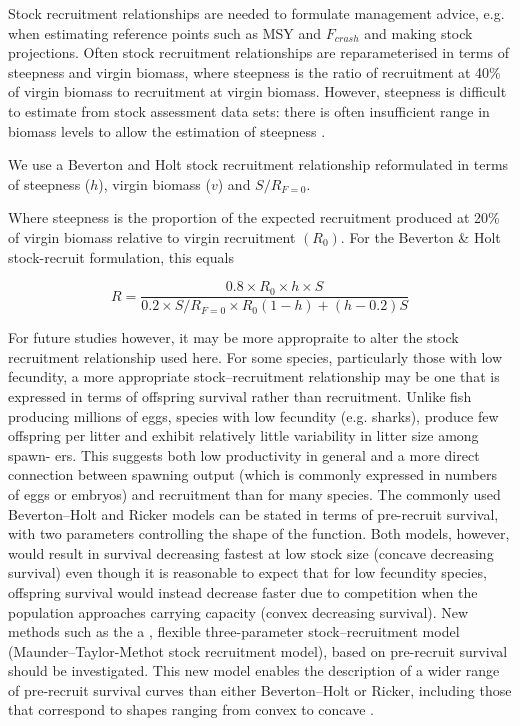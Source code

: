 \documentclass[preprint,authoryear,12pt]{elsarticle}
\begin{document}
Stock recruitment relationships are needed to formulate management advice, e.g. when estimating reference points such as MSY and $F_{crash}$ and making stock projections. 
Often stock recruitment relationships are reparameterised in terms of steepness and virgin biomass, where steepness  
is the ratio of recruitment at 40\% of virgin biomass to recruitment at virgin biomass. However, steepness is difficult to estimate from  
stock assessment data sets: there is often insufficient range in biomass levels to allow the estimation of steepness \citet{ISSF2011steep}. 
 
We use a Beverton and Holt stock recruitment relationship reformulated in terms of steepness ($h$), virgin biomass ($v$) and $S/R_{F=0}$. 
 
Where steepness is the proportion of the expected recruitment produced at 20\% of virgin biomass relative to virgin recruitment $(R_0)$. For the Beverton \& Holt  
stock-recruit formulation, this equals 
 
\begin{equation} 
R=\frac{0.8 \times R_0 \times h \times S}{0.2 \times S/R_{F=0} \times R_0(1-h)+(h-0.2)S} 
\end{equation}  
 
For future studies however, it may be more appropraite to alter the stock recruitment relationship used here. For some species, 
particularly those with low  
fecundity, a more appropriate stock–recruitment relationship may  
be one that is expressed in terms of offspring survival rather 
than recruitment. Unlike fish producing millions of eggs, species 
with low fecundity (e.g. sharks), produce few offspring per litter  
and exhibit relatively little variability in litter size among spawn-  
ers. This suggests both low productivity in general and a more  
direct connection between spawning output (which is commonly 
expressed in numbers of eggs or embryos) and recruitment than  
for many species. The commonly used Beverton–Holt and Ricker 
models can be stated in terms of pre-recruit survival, with two  
parameters controlling the shape of the function. Both models, however, would result in survival decreasing fastest at low stock 
size (concave decreasing survival) even though it is  reasonable 
to expect that for low fecundity species, offspring survival would 
instead decrease faster due to competition when the population 
approaches carrying capacity (convex decreasing survival). New methods such as the a , flexible three-parameter 
stock–recruitment model (Maunder–Taylor-Methot stock recruitment 
model), based on pre-recruit survival should be investigated. This new model enables 
the description of a wider range of pre-recruit survival curves than 
either Beverton–Holt or Ricker, including those that correspond to 
shapes ranging from convex to concave \citet{taylor2012srr}. 
\end{document}
